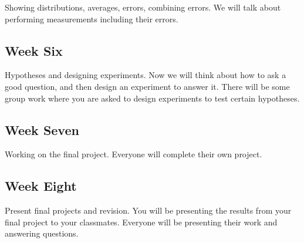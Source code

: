 Showing distributions, averages, errors, combining errors.  We will talk about performing measurements including their errors.

\subsection*{Week Six}

Hypotheses and designing experiments.  Now we will think about how to ask a good question, and then design an experiment to answer it.  There will be some group work where you are asked to design experiments to test certain hypotheses.

\subsection*{Week Seven}

Working on the final project.  Everyone will complete their own project.

\subsection*{Week Eight}

Present final projects and revision.  You will be presenting the results from your final project to your classmates.  Everyone will be presenting their work and answering questions.




